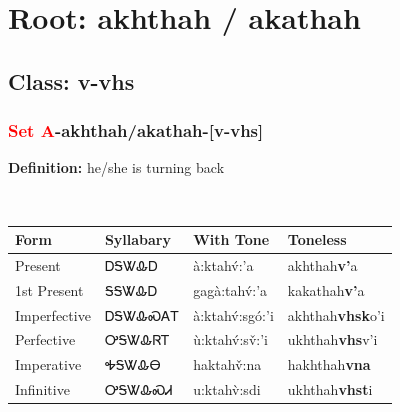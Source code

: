 \needspace{4in}
\section*{Root: akhthah / akathah}
\nopagebreak
{}
\needspace{3in}
\subsection*{Class: v-vhs}
\nopagebreak
\needspace{2in}
\subsubsection*{\textcolor{Red}{Set A}{-}\textbf{akhthah/akathah}{-}[v-vhs]}
\nopagebreak
\textbf{Definition: } he/she is turning back
\\[0.5em]
\begin{tabularx}{\textwidth}{l X X X}%
\toprule%
\textbf{Form}&\textbf{Syllabary}&\textbf{With Tone}&\textbf{Toneless}\\%
\midrule%
Present&ᎠᎦᏔᎲᎠ&à:ktahv́:’a&akhthah\textbf{v'}a\\%
1st Present&ᎦᎦᏔᎲᎠ&gagà:tahv́:’a&kakathah\textbf{v'}a\\%
Imperfective&ᎠᎦᏔᎲᏍᎪᎢ&à:ktahv́:sgó:’i&akhthah\textbf{vhsk}o'i\\%
Perfective&ᎤᎦᏔᎲᏒᎢ&ù:ktahv́:sv̌:’i&ukhthah\textbf{vhs}v'i\\%
Imperative&ᎭᎦᏔᎲᎾ&haktahv̌:na&hakhthah\textbf{vna}\\%
Infinitive&ᎤᎦᏔᎲᏍᏗ&u:ktahv̀:sdi&ukhthah\textbf{vhst}i\\%
\bottomrule%
\end{tabularx}
\\[1em]